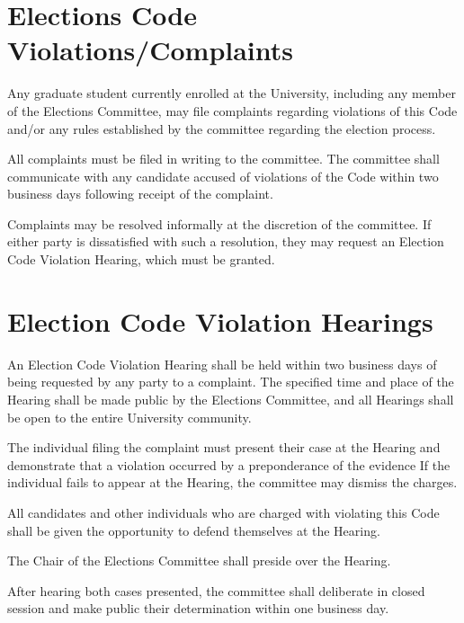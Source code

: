 \section{Elections Code Violations/Complaints}
\begin{bylaws-number}
  \item Any graduate student currently enrolled at the University, including any member of the Elections Committee, may file complaints regarding violations of this Code and/or any rules established by the committee regarding the election process.
  \item All complaints must be filed in writing to the committee. The committee shall communicate with any candidate accused of violations of the Code within two business days following receipt of the complaint.
  \item Complaints may be resolved informally at the discretion of the committee. If either party is dissatisfied with such a resolution, they may request an Election Code Violation Hearing, which must be granted.
\end{bylaws-number}

\section{Election Code Violation Hearings}
\begin{bylaws-number}
  \item An Election Code Violation Hearing shall be held within two business days of being requested by any party to a complaint. The specified time and place of the Hearing shall be made public by the Elections Committee, and all Hearings shall be open to the entire University community.
  \item The individual filing the complaint must present their case at the Hearing and demonstrate that a violation occurred by a preponderance of the evidence If the individual fails to appear at the Hearing, the committee may dismiss the charges.
  \item All candidates and other individuals who are charged with violating this Code shall be given the opportunity to defend themselves at the Hearing.
  \item The Chair of the Elections Committee shall preside over the Hearing.
  \item After hearing both cases presented, the committee shall deliberate in closed session and make public their determination within one business day.
\end{bylaws-number}

